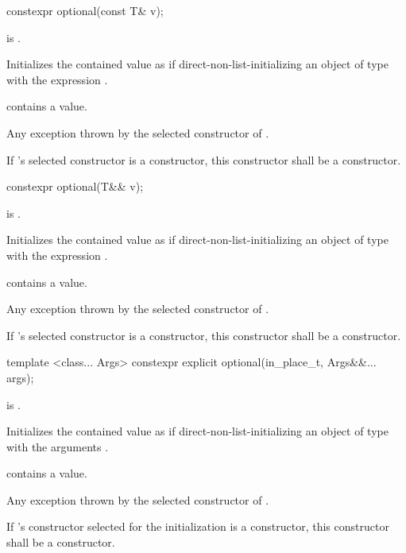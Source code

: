 \begin{itemdecl}
constexpr optional(const T& v);
\end{itemdecl}

\begin{itemdescr}
\pnum
\requires
{} is .

\pnum
\effects
Initializes the contained value as if direct-non-list-initializing an object of type  with the expression .

\pnum
\postcondition
{} contains a value.

\pnum
\throws
Any exception thrown by the selected constructor of .

\pnum
\remarks
If 's selected constructor is a  constructor, this constructor shall be a  constructor.
\end{itemdescr}

\begin{itemdecl}
constexpr optional(T&& v);
\end{itemdecl}

\begin{itemdescr}
\pnum
\requires
{} is .

\pnum
\effects
Initializes the contained value as if direct-non-list-initializing an object of type  with the expression .

\pnum
\postcondition
{} contains a value.

\pnum
\throws
Any exception thrown by the selected constructor of .

\pnum
\remarks
If 's selected constructor is a  constructor, this constructor shall be a  constructor.
\end{itemdescr}

\begin{itemdecl}
template <class... Args> constexpr explicit optional(in_place_t, Args&&... args);
\end{itemdecl}

\begin{itemdescr}
\pnum
\requires
{} is .

\pnum
\effects
Initializes the contained value as if direct-non-list-initializing an object of type  with the arguments .

\pnum
\postcondition
{} contains a value.

\pnum
\throws
Any exception thrown by the selected constructor of .

\pnum
\remarks
If 's constructor selected for the initialization is a  constructor, this constructor shall be a  constructor.
\end{itemdescr}


